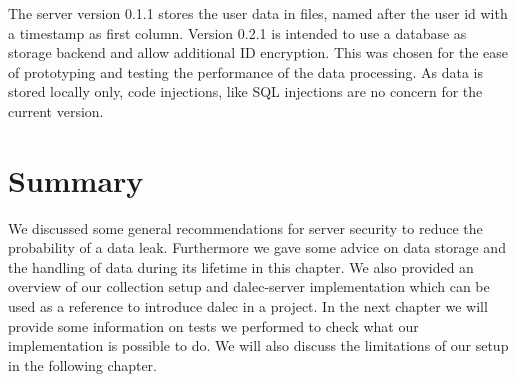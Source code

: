 \newpage
        The server version 0.1.1 stores the user data in files, named after the user id with a timestamp as first column. Version 0.2.1 is intended to use a database as storage backend and allow additional ID encryption. This was chosen for the ease of prototyping and testing the performance of the data processing.
        As data is stored locally only, code injections, like SQL injections are no concern for the current version. 
        
%
\section{Summary}
We discussed some general recommendations for server security to reduce the probability of a data leak. Furthermore we gave some advice on data storage and the handling of data during its lifetime in this chapter. We also provided an overview of our collection setup and dalec-server implementation which can be used as a reference to introduce dalec in a project. In the next chapter we will provide some information on tests we performed to check what our implementation is possible to do. We will also discuss the limitations of our setup in the following chapter.

%
